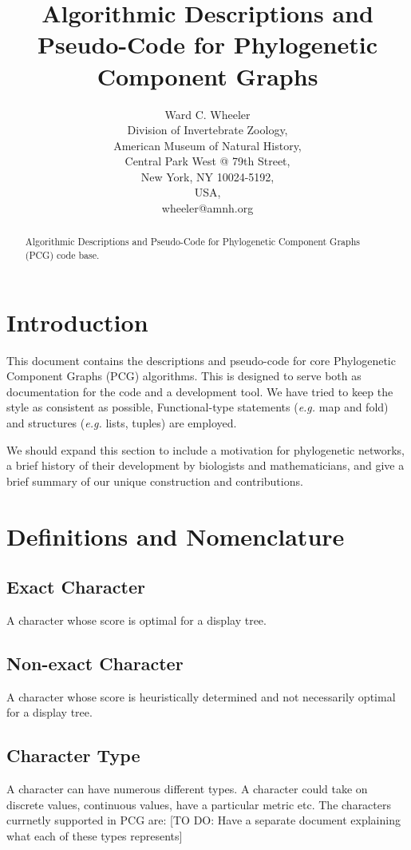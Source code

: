 \documentclass[11pt]{article}
\title{Algorithmic Descriptions and Pseudo-Code for Phylogenetic Component Graphs}
\author{Ward C. Wheeler\\
		Division of Invertebrate Zoology,\\
		American Museum of Natural History,\\
		Central Park West @ 79th Street,\\
		New York, NY 10024-5192,\\
		USA,\\
		wheeler@amnh.org}
\begin{document}
\maketitle
\begin{abstract}
	Algorithmic Descriptions and Pseudo-Code for Phylogenetic Component Graphs (PCG) code base.
\end{abstract}
\tableofcontents

\section{Introduction} \label{Introduction}
This document contains the descriptions and pseudo-code for core  Phylogenetic Component Graphs (PCG) algorithms.  
This is designed to serve both as documentation for the code and a development tool. 
We have tried to keep the style as consistent as possible, Functional-type statements (\textit{e.g.} map and fold) and structures (\textit{e.g.} lists, tuples) are employed.

We should expand this section to include a motivation for phylogenetic networks, a brief history of their development by biologists and mathematicians, and give a brief summary of our unique construction and contributions.

\section{Definitions and Nomenclature}

\subsection{Exact Character}

A character whose score is optimal for a display tree.

\subsection{Non-exact Character}

A character whose score is heuristically determined and not necessarily optimal for a display tree.

\subsection{Character Type}

A character can have numerous different types. 
A character could take on discrete values, continuous values, have a particular metric etc. 
The characters currnetly supported in PCG are: [TO DO: Have a separate document explaining what each of these types represents]
\end{document}
